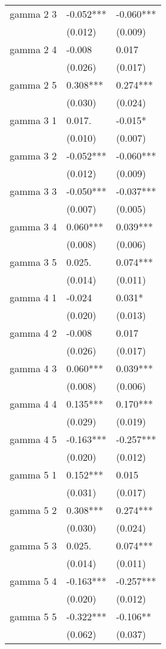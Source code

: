 \begin{tabular}{lll}
  gamma 2 3 & -0.052*** & -0.060*** \\ 
   & (0.012) & (0.009) \\ 
  gamma 2 4 & -0.008 & 0.017 \\ 
   & (0.026) & (0.017) \\ 
  gamma 2 5 & 0.308*** & 0.274*** \\ 
   & (0.030) & (0.024) \\ 
  gamma 3 1 & 0.017. & -0.015* \\ 
   & (0.010) & (0.007) \\ 
  gamma 3 2 & -0.052*** & -0.060*** \\ 
   & (0.012) & (0.009) \\ 
  gamma 3 3 & -0.050*** & -0.037*** \\ 
   & (0.007) & (0.005) \\ 
  gamma 3 4 & 0.060*** & 0.039*** \\ 
   & (0.008) & (0.006) \\ 
  gamma 3 5 & 0.025. & 0.074*** \\ 
   & (0.014) & (0.011) \\ 
  gamma 4 1 & -0.024 & 0.031* \\ 
   & (0.020) & (0.013) \\ 
  gamma 4 2 & -0.008 & 0.017 \\ 
   & (0.026) & (0.017) \\ 
  gamma 4 3 & 0.060*** & 0.039*** \\ 
   & (0.008) & (0.006) \\ 
  gamma 4 4 & 0.135*** & 0.170*** \\ 
   & (0.029) & (0.019) \\ 
  gamma 4 5 & -0.163*** & -0.257*** \\ 
   & (0.020) & (0.012) \\ 
  gamma 5 1 & 0.152*** & 0.015 \\ 
   & (0.031) & (0.017) \\ 
  gamma 5 2 & 0.308*** & 0.274*** \\ 
   & (0.030) & (0.024) \\ 
  gamma 5 3 & 0.025. & 0.074*** \\ 
   & (0.014) & (0.011) \\ 
  gamma 5 4 & -0.163*** & -0.257*** \\ 
   & (0.020) & (0.012) \\ 
  gamma 5 5 & -0.322*** & -0.106** \\ 
   & (0.062) & (0.037) \\ 
   \hline
\end{tabular}
